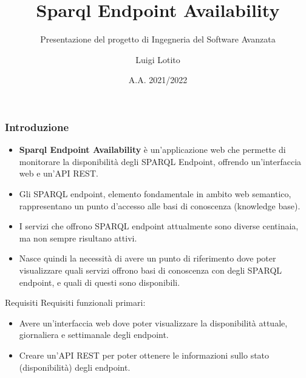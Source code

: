 \documentclass[8pt]{beamer}
\title{Sparql Endpoint Availability}
\subtitle{Presentazione del progetto di Ingegneria del Software Avanzata}
\author{Luigi Lotito}
\date{A.A. 2021/2022}
\begin{document}
\begin{frame}
    \titlepage
\end{frame}

\begin{frame}
    \frametitle{Introduzione}
    \begin{itemize}
        \item \textbf{Sparql Endpoint Availability} è un'applicazione web
              che permette di monitorare la disponibilità
              degli SPARQL Endpoint, offrendo un'interfaccia web e un'API REST.
        \item Gli SPARQL endpoint, elemento fondamentale in ambito web semantico, rappresentano un punto d'accesso alle basi di conoscenza (knowledge base).
        \item I servizi che offrono SPARQL endpoint attualmente sono diverse centinaia, ma non sempre risultano attivi.
        \item Nasce quindi la necessità di avere un punto di riferimento dove poter visualizzare quali servizi offrono basi di conoscenza con degli SPARQL endpoint, e quali di questi sono disponibili.
    \end{itemize}
\end{frame}

\begin{frame}{Requisiti}
    Requisiti funzionali primari:
    \begin{itemize}
        \item Avere un'interfaccia web dove poter visualizzare la disponibilità attuale, giornaliera e settimanale degli endpoint.
        \item Creare un'API REST per poter ottenere le informazioni sullo stato (disponibilità) degli endpoint.
    \end{itemize}
\end{frame}
\end{document}
